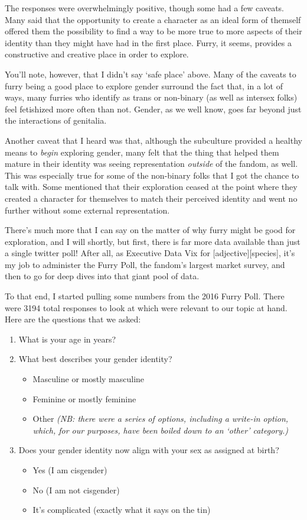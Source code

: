 The responses were overwhelmingly positive, though some had a few caveats.  Many said that the opportunity to create a character as an ideal form of themself offered them the possibility to find a way to be more true to more aspects of their identity than they might have had in the first place.  Furry, it seems, provides a constructive and creative place in order to explore.

You'll note, however, that I didn't say `safe place' above.  Many of the caveats to furry being a good place to explore gender surround the fact that, in a lot of ways, many furries who identify as trans or non-binary (as well as intersex folks) feel fetishized more often than not.  Gender, as we well know, goes far beyond just the interactions of genitalia.

Another caveat that I heard was that, although the subculture provided a healthy means to \textit{begin} exploring gender, many felt that the thing that helped them mature in their identity was seeing representation \textit{outside} of the fandom, as well.  This was especially true for some of the non-binary folks that I got the chance to talk with.  Some mentioned that their exploration ceased at the point where they created a character for themselves to match their perceived identity and went no further without some external representation.

There's much more that I can say on the matter of why furry might be good for exploration, and I will shortly, but first, there is far more data available than just a single twitter poll!  After all, as Executive Data Vix for [adjective][species], it's my job to administer the Furry Poll, the fandom's largest market survey, and then to go for deep dives into that giant pool of data.

To that end, I started pulling some numbers from the 2016 Furry Poll.  There were 3194 total responses to look at which were relevant to our topic at hand.  Here are the questions that we asked:

\begin{enumerate}
  \item What is your age in years?
  \item What best describes your gender identity?
  \begin{itemize}
    \item Masculine or mostly masculine
    \item Feminine or mostly feminine
    \item Other \textit{(NB: there were a series of options, including a write-in option, which, for our purposes, have been boiled down to an `other' category.)}
  \end{itemize}
  \item Does your gender identity now align with your sex as assigned at birth?
  \begin{itemize}
    \item Yes (I am cisgender)
    \item No (I am not cisgender)
    \item It's complicated (exactly what it says on the tin)
  \end{itemize}
\end{enumerate}

